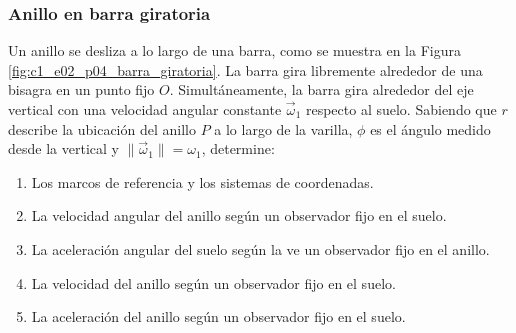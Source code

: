 \subsubsection{Anillo en barra giratoria}
Un anillo se desliza a lo largo de una barra, como se muestra en la Figura \ref{fig:c1_e02_p04_barra_giratoria}. La barra gira libremente alrededor de una bisagra en un punto fijo $O$. Simultáneamente, la barra gira alrededor del eje vertical con una velocidad angular constante $\vec{\omega}_1$ respecto al suelo. Sabiendo que $r$ describe la ubicación del anillo $P$ a lo largo de la varilla, $\phi$ es el ángulo medido desde la vertical y $\|\vec{\omega}_1\| = \omega_1$, determine:

\begin{enumerate}
    \item Los marcos de referencia y los sistemas de coordenadas.
    \item La velocidad angular del anillo según un observador fijo en el suelo.
    \item La aceleración angular del suelo según la ve un observador fijo en el anillo.
    \item La velocidad del anillo según un observador fijo en el suelo.
    \item La aceleración del anillo según un observador fijo en el suelo.
\end{enumerate}

